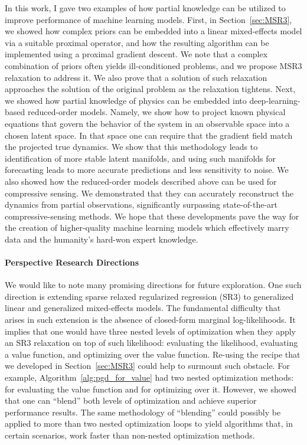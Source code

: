 In this work, I gave two examples of how partial knowledge can be utilized to improve performance of machine learning models. First, in Section~\ref{sec:MSR3}, we showed how complex priors can be embedded into a linear mixed-effects model via a suitable proximal operator, and how the resulting algorithm can be implemented using a proximal gradient descent. We note that a complex combination of priors often yields ill-conditioned problems, and we propose MSR3 relaxation to address it. We also prove that a solution of such relaxation approaches the solution of the original problem as the relaxation tightens. Next, we showed how partial knowledge of physics can be embedded into deep-learning-based reduced-order models. Namely, we show how to project known physical equations that govern the behavior of the system in an observable space into a chosen latent space. In that space one can require that the gradient field match the projected true dynamics. We show that this methodology leads to identification of more stable latent manifolds, and using such manifolds for forecasting leads to more accurate predictions and less sensitivity to noise. We also showed how the reduced-order models described above can be used for compressive sensing. We demonstrated that they can accurately reconstruct the dynamics from partial observations, significantly surpassing state-of-the-art compressive-sensing methods. We hope that these developments pave the way for the creation of higher-quality machine learning models which effectively marry data and the humanity's hard-won expert knowledge. 

\paragraph{Perspective Research Directions} We would like to note many promising directions for future exploration. One such direction is extending sparse relaxed regularized regression (SR3) to generalized linear and generalized mixed-effects models. The fundamental difficulty that arises in such extension is the absence of closed-form marginal log-likelihoods. It implies that one would have three nested levels of optimization when they apply an SR3 relaxation on top of such likelihood: evaluating the likelihood, evaluating a value function, and optimizing over the value function. Re-using the recipe that we developed in Section~\ref{sec:MSR3} could help to surmount such obstacle. For example, Algorithm~\ref{alg:pgd_for_value} had two nested optimization methods: for evaluating the value function and for optimizing over it. However, we showed that one can ``blend'' both levels of optimization and achieve superior performance results. The same methodology of ``blending'' could possibly be applied to more than two nested optimization loops to yield algorithms that, in certain scenarios, work faster than non-nested optimization methods.

